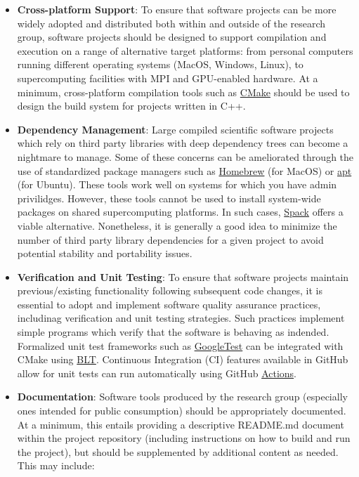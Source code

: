\documentclass[12pt,a4paper,article,oneside]{memoir} %
\begin{document}
\begin{itemize}
\item \textbf{Cross-platform Support}: To ensure that software projects can be more widely adopted and distributed both within and outside of the research group, software projects should be designed to support compilation and execution on a range of alternative target platforms: from personal computers running different operating systems (MacOS, Windows, Linux), to supercomputing facilities with MPI and GPU-enabled hardware. At a minimum, cross-platform compilation tools such as \href{https://cmake.org}{CMake} should be used to design the build system for projects written in C++.
\item \textbf{Dependency Management}: Large compiled scientific software projects which rely on third party libraries with deep dependency trees can become a nightmare to manage. Some of these concerns can be ameliorated through the use of standardized package managers such as \href{https://brew.sh}{Homebrew} (for MacOS) or \href{https://documentation.ubuntu.com/server/how-to/software/package-management/}{apt} (for Ubuntu). These tools work well on systems for which you have admin privilidges. However, these tools cannot be used to install system-wide packages on shared supercomputing platforms. In such cases, \href{https://spack.io}{Spack} offers a viable alternative. Nonetheless, it is generally a good idea to minimize the number of third party library dependencies for a given project to avoid potential stability and portability issues.
\item \textbf{Verification and Unit Testing}: To ensure that software projects maintain previous/existing functionality following subsequent code changes, it is essential to adopt and implement software quality assurance practices, includinag verification and unit testing strategies. Such practices implement simple programs which verify that the software is behaving as indended. Formalized unit test frameworks such as \href{https://google.github.io/googletest/}{GoogleTest} can be integrated with CMake using \href{https://computing.llnl.gov/projects/blt-build-link-test}{BLT}. Continuous Integration (CI) features available in GitHub allow for unit tests can run automatically using GitHub \href{https://docs.github.com/en/actions/get-started/understand-github-actions}{Actions}.
\item \textbf{Documentation}: Software tools produced by the research group (especially ones intended for public consumption) should be appropriately documented. At a minimum, this entails providing a descriptive README.md document within the project repository (including instructions on how to build and run the project), but should be supplemented by additional content as needed. This may include:

\end{itemize}
\end{document}
